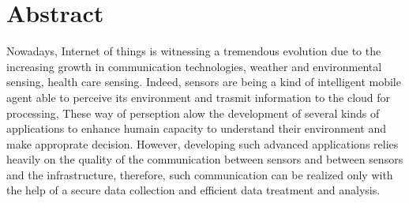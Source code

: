 \chapter*{Abstract}

Nowadays,
	Internet of things is witnessing a tremendous evolution due to the increasing growth in communication technologies,
	weather and environmental sensing, health care sensing.
Indeed,
	sensors are being a kind of intelligent mobile agent able to perceive its environment and trasmit information to the cloud for processing,
These way of perseption alow the development of several kinds of applications to enhance humain capacity to understand their environment and make approprate decision.
However,
	developing such advanced applications relies heavily on the quality of the communication between sensors and between sensors and the infrastructure,
	therefore,
	such communication can be realized only with the help of a secure data collection and efficient data treatment and analysis.

